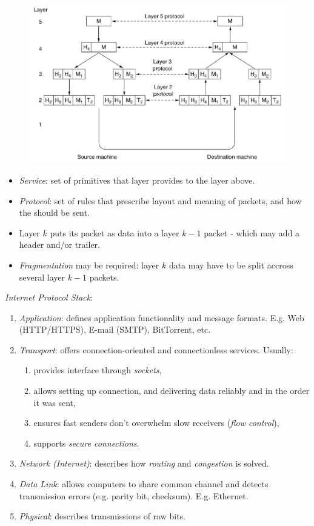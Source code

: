 \documentclass[twocolumn,english]{article}
\begin{document}
\begin{figure}[H]
\centering{}\includegraphics[width=0.5\linewidth]{img/protocol-layering}
\end{figure}
\begin{itemize}
\item \emph{Service}: set of primitives that layer provides to the layer
above.
\item \emph{Protocol}: set of rules that prescribe layout and meaning of
packets, and how the should be sent.
\item Layer $k$ puts its packet as data into a layer $k-1$ packet - which
may add a header and/or trailer.
\item \emph{Fragmentation} may be required: layer $k$ data may have to
be split accross several layer $k-1$ packets.
\end{itemize}
\emph{Internet Protocol Stack}:
\begin{enumerate}
\item \emph{Application}: defines application functionality and message
formats. E.g. Web (HTTP/HTTPS), E-mail (SMTP), BitTorrent, etc.
\item \emph{Transport}: offers connection-oriented and connectionless services.
Usually:
\begin{enumerate}
\item provides interface through \emph{sockets}, 
\item allows setting up connection, and delivering data reliably and in
the order it was sent,
\item ensures fast senders don't overwhelm slow receivers (\emph{flow control}),
\item supports \emph{secure connections}.
\end{enumerate}
\item \emph{Network (Internet)}: describes how \emph{routing} and \emph{congestion}
is solved.
\item \emph{Data Link}: allows computers to share common channel and detects
transmission errors (e.g. parity bit, checksum). E.g. Ethernet.
\item \emph{Physical}: describes transmissions of raw bits.
\end{enumerate}
\end{document}

